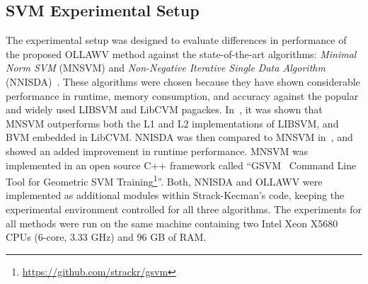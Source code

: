 \documentclass[reqno]{vcuthesis}
\numberwithin{equation}{chapter}
\begin{document}
\subsection{SVM Experimental Setup}\label{subsec:expsvm}
The experimental setup was designed to evaluate differences in performance of the proposed OLLAWV method against the state-of-the-art algorithms: \textit{Minimal Norm SVM} (MNSVM) \cite{strack2013geometric} and \textit{Non-Negative Iterative Single Data Algorithm} (NNISDA)~\cite{zigic2016}. These algorithms were chosen because they have shown considerable performance in runtime, memory consumption, and accuracy against the popular and widely used LIBSVM and LibCVM pagackes. In~\cite{strack2013geometric}, it was shown that MNSVM outperforms both the L1 and L2 implementations of LIBSVM, and BVM embedded in LibCVM. NNISDA was then compared to MNSVM in~\cite{zigic2016}, and showed an added improvement in runtime performance. MNSVM was implemented in an open source C++ framework called ``GSVM \textendash ~Command Line Tool for Geometric SVM Training\footnote{\url{https://github.com/strackr/gsvm}}''. Both, NNISDA and OLLAWV were implemented as additional modules within Strack-Kecman's code, keeping the experimental environment controlled for all three algorithms. The experiments for all methods were run on the same machine containing two Intel Xeon X5680 CPUs (6-core, 3.33 GHz) and 96 GB of RAM.
\end{document}

